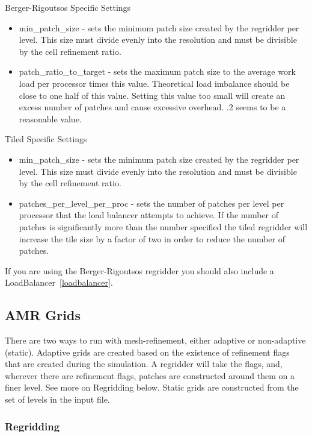 Berger-Rigoutsos Specific Settings 

\begin{itemize}
\item min\_patch\_size - sets the minimum patch size created by the
  regridder per level. This size must divide evenly into the
  resolution and must be divisible by the cell refinement ratio.
\item patch\_ratio\_to\_target - sets the maximum patch size to the
  average work load per processor times this value. Theoretical load
  imbalance should be close to one half of this value. Setting this
  value too small will create an excess number of patches and cause
  excessive overhead. .2 seems to be a reasonable value.
\end{itemize}

Tiled Specific Settings 
\begin{itemize}
\item min\_patch\_size - sets the minimum patch size created by the
  regridder per level. This size must divide evenly into the
  resolution and must be divisible by the cell refinement ratio.
\item patches\_per\_level\_per\_proc - sets the number of patches per
  level per processor that the load balancer attempts to achieve. If
  the number of patches is significantly more than the number
  specified the tiled regridder will increase the tile size by a
  factor of two in order to reduce the number of patches.
\end{itemize}

If you are using the Berger-Rigoutsos regridder you should also
include a LoadBalancer~\ref{loadbalancer}.


\subsection{AMR Grids}


There are two ways to run with mesh-refinement, either adaptive or
non-adaptive (static). Adaptive grids are created based on the
existence of refinement flags that are created during the
simulation. A regridder will take the flags, and, wherever there are
refinement flags, patches are constructed around them on a finer
level. See more on Regridding below. Static grids are constructed from
the set of levels in the input file.

\subsubsection{Regridding}


